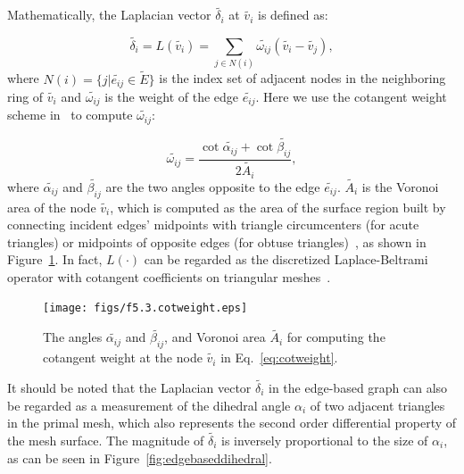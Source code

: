 Mathematically, the Laplacian vector $\tilde{\delta_i}$ at $\tilde{v_i}$ is defined as:

\begin{equation}
\label{eq:edgelaplacian}
\tilde{\delta_i}=L(\tilde{v_i})=\sum\limits_{j\in N(i)}{\tilde{\omega_{ij}} (\tilde{v_i}-\tilde{v_j})},
\end{equation}
where $N(i)=\{j|\tilde{e_{ij}}\in \tilde{E}\}$ is the  index set of
adjacent nodes in the neighboring ring of $\tilde{v_i}$ and
$\tilde{\omega_{ij}}$ is the weight of the edge $\tilde{e_{ij}}$.
Here we use the cotangent weight scheme in~\cite{MDSB02} to compute
$\tilde{\omega_{ij}}$:

\begin{equation}
\label{eq:cotweight}
\tilde{\omega_{ij}}=\frac{{\cot{\tilde{\alpha_{ij}}}+\cot{\tilde{\beta_{ij}}}}}{{2\tilde{A_i}}},
\end{equation}
where $\tilde{\alpha_{ij}}$ and $\tilde{\beta_{ij}}$ are the two angles
opposite to the edge $\tilde{e_{ij}}$. $\tilde{A_i}$ is the Voronoi
area of the node $\tilde{v_i}$, which is computed as the area of
the surface region built by connecting incident edges' midpoints
with triangle circumcenters (for acute triangles) or midpoints of
opposite edges (for obtuse triangles)~\cite{MDSB02}, as shown
in Figure~\ref{fig:edgebasedcotweight}. In fact, $L(\cdot)$ can
be regarded as the discretized Laplace-Beltrami operator with
cotangent coefficients on triangular meshes~\cite{BS08}.

\begin{figure} [htbp]
    \centering
  \texttt{[image: figs/f5.3.cotweight.eps]}
  \caption{The angles $\tilde{\alpha_{ij}}$ and $\tilde{\beta_{ij}}$, and
  Voronoi area $\tilde{A_i}$ for computing the cotangent weight
  at the node $\tilde{v_i}$ in Eq.~\ref{eq:cotweight}.}
  \label{fig:edgebasedcotweight} %
\end{figure}


It should be noted that the Laplacian  vector $\tilde{\delta_i}$ in
the edge-based graph can also be regarded as a measurement of the
dihedral angle $\alpha_i$ of two adjacent triangles in the primal
mesh, which also represents the second order differential property
of the mesh surface. The magnitude of $\tilde{\delta_i}$ is
inversely proportional to the size of $\alpha_i$, as can be seen in
Figure~\ref{fig:edgebaseddihedral}.

